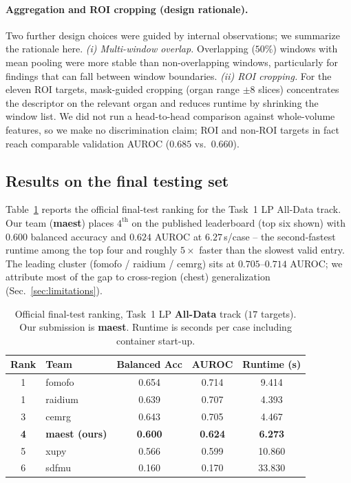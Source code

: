 \documentclass[runningheads]{llncs}
\begin{document}
\paragraph{Aggregation and ROI cropping (design rationale).}
Two further design choices were guided by internal observations; we summarize
the rationale here.
\emph{(i) Multi-window overlap.} Overlapping ($50\%$) windows with mean pooling
were more stable than non-overlapping windows, particularly for findings that can
fall between window boundaries.
\emph{(ii) ROI cropping.} For the eleven ROI targets, mask-guided cropping
(organ range $\pm 8$ slices) concentrates the descriptor on the relevant organ
and reduces runtime by shrinking the window list. We did not run a head-to-head
comparison against whole-volume features, so we make no discrimination claim;
ROI and non-ROI targets in fact reach comparable validation AUROC
($0.685$ vs.\ $0.660$).

\subsection{Results on the final testing set}
\label{sec:test}
Table~\ref{tab:leaderboard} reports the official final-test ranking for the
Task~1 LP All-Data track. Our team (\textbf{maest}) places $4^{\text{th}}$ on the
published leaderboard (top six shown)
with $0.600$ balanced accuracy and $0.624$ AUROC at $6.27$\,s/case -- the
second-fastest runtime among the top four and roughly $5\times$ faster than the
slowest valid entry. The leading cluster (fomofo / raidium / cemrg) sits at
$0.705$--$0.714$ AUROC; we attribute most of the gap to cross-region (chest)
generalization (Sec.~\ref{sec:limitations}).

\begin{table}[htbp]
\caption{Official final-test ranking, Task~1 LP \textbf{All-Data} track ($17$
targets). Our submission is \textbf{maest}. Runtime is seconds per case including
container start-up.}\label{tab:leaderboard}
\centering
\begin{tabular}{clccc}
\hline
Rank & Team & Balanced Acc & AUROC & Runtime (s) \\ \hline
1 & fomofo            & 0.654 & 0.714 & 9.414 \\
1 & raidium           & 0.639 & 0.707 & 4.393 \\
3 & cemrg             & 0.643 & 0.705 & 4.467 \\
\textbf{4} & \textbf{maest (ours)} & \textbf{0.600} & \textbf{0.624} & \textbf{6.273} \\
5 & xupy              & 0.566 & 0.599 & 10.860 \\
6 & sdfmu             & 0.160 & 0.170 & 33.830 \\ \hline
\end{tabular}
\end{table}
\end{document}
